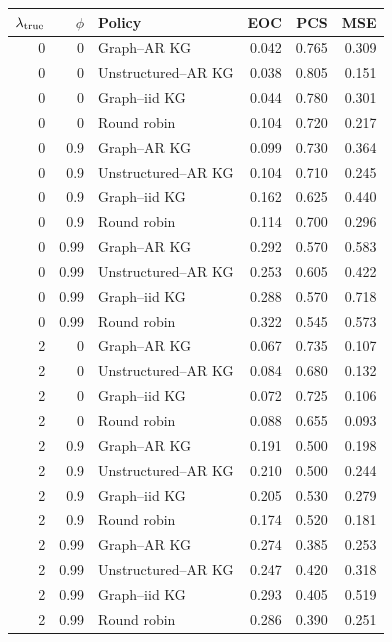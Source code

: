 \begin{tabular}{rrlrrr}
\toprule
$\lambda_{\rm true}$ & $\phi$ & Policy & EOC & PCS & MSE \\
\midrule
0 & 0 & Graph--AR KG & 0.042 & 0.765 & 0.309 \\
0 & 0 & Unstructured--AR KG & 0.038 & 0.805 & 0.151 \\
0 & 0 & Graph--iid KG & 0.044 & 0.780 & 0.301 \\
0 & 0 & Round robin & 0.104 & 0.720 & 0.217 \\
0 & 0.9 & Graph--AR KG & 0.099 & 0.730 & 0.364 \\
0 & 0.9 & Unstructured--AR KG & 0.104 & 0.710 & 0.245 \\
0 & 0.9 & Graph--iid KG & 0.162 & 0.625 & 0.440 \\
0 & 0.9 & Round robin & 0.114 & 0.700 & 0.296 \\
0 & 0.99 & Graph--AR KG & 0.292 & 0.570 & 0.583 \\
0 & 0.99 & Unstructured--AR KG & 0.253 & 0.605 & 0.422 \\
0 & 0.99 & Graph--iid KG & 0.288 & 0.570 & 0.718 \\
0 & 0.99 & Round robin & 0.322 & 0.545 & 0.573 \\
2 & 0 & Graph--AR KG & 0.067 & 0.735 & 0.107 \\
2 & 0 & Unstructured--AR KG & 0.084 & 0.680 & 0.132 \\
2 & 0 & Graph--iid KG & 0.072 & 0.725 & 0.106 \\
2 & 0 & Round robin & 0.088 & 0.655 & 0.093 \\
2 & 0.9 & Graph--AR KG & 0.191 & 0.500 & 0.198 \\
2 & 0.9 & Unstructured--AR KG & 0.210 & 0.500 & 0.244 \\
2 & 0.9 & Graph--iid KG & 0.205 & 0.530 & 0.279 \\
2 & 0.9 & Round robin & 0.174 & 0.520 & 0.181 \\
2 & 0.99 & Graph--AR KG & 0.274 & 0.385 & 0.253 \\
2 & 0.99 & Unstructured--AR KG & 0.247 & 0.420 & 0.318 \\
2 & 0.99 & Graph--iid KG & 0.293 & 0.405 & 0.519 \\
2 & 0.99 & Round robin & 0.286 & 0.390 & 0.251 \\
\bottomrule
\end{tabular}
